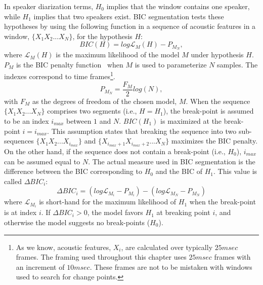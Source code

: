 In speaker diarization terms, $H_0$ implies that the window contains one speaker, while $H_1$ implies that two speakers exist. 
BIC segmentation tests these hypotheses by using the following function in a sequence of acoustic features in a window, $\{X_1X_2...X_N\}$, for the hypothesis $H$:
\begin{equation}
BIC(H) = log\mathcal{L}_{M}(H) - P_{M_{N}}, 
\end{equation}
where $\mathcal{L}_{M}(H)$ is the maximum likelihood of the model $M$ under hypothesis $H$. $P_M$ is the BIC penalty function~\cite{schwarz1978BIC} when $M$ is used to parameterize $N$ samples. The indexes correspond to time frames\footnote{As we know, acoustic features, $X_i$, are calculated over typically $25 msec$ frames. 
The framing used throughout this chapter uses $25 msec$ frames with an increment of $10 msec$. These frames are not to be mistaken with windows used to search for change points.}. 
\begin{equation}
P_{M_N} = \frac{F_M}{2}log(N),
\end{equation}
with $F_M$ as the degrees of freedom of the chosen model, $M$. 
When the sequence $\{X_1X_2...X_N\}$ comprises two segments (i.e., $H = H_1$), the break-point is assumed to be an index $i_{max}$ between $1$ and $N$. 
$BIC(H_1)$ is maximized at the break-point $i = i_{max}$. 
This assumption states that breaking the sequence into two sub-sequences $\{X_1X_2...X_{i_{max}}\}$ and $\{X_{i_{max}+1}X_{i_{max}+2}...X_N\}$ maximizes the BIC penalty. 
On the other hand, if the sequence does not contain a break-point (i.e., $H_0$), $i_{max}$ can be assumed equal to $N$. 
The actual measure used in BIC segmentation is the difference between the BIC corresponding to $H_0$ and the BIC of $H_1$. This value is called $\Delta BIC_i$: 
\begin{equation}
\Delta BIC_i = (log \mathcal{L}_{M_i} - P_{M_i}) - (log \mathcal{L}_{M_N} - P_{M_N})
\end{equation}
where $\mathcal{L}_{M_i}$ is short-hand for the maximum likelihood of $H_1$ when the break-point is at index $i$. 
If $\Delta BIC_i > 0$, the model favors $H_1$ at breaking point $i$, and otherwise the model suggests no break-points ($H_0$).  

